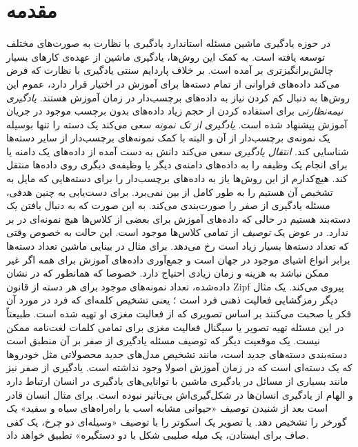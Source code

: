 \section{مقدمه}\label{intro}

 در حوزه یادگیری ماشین مسئله استاندارد یادگیری با نظارت به صورت‌های مختلف توسعه یافته است. به کمک این روش‌ها، یادگیری ماشین از عهده‌ی کارهای بسیار چالش‌برانگیزتری بر آمده است. بر خلاف پاردایم سنتی یادگیری با نظارت که فرض می‌کند داده‌های فراوانی از تمام دسته‌ها برای آموزش در اختیار قرار دارد، عموم این روش‌ها به دنبال کم کردن نیاز به داده‌های برچسب‌دار در زمان آموزش هستند. 
\emph{ یادگیری نیمه‌نظارتی}  \cite{chapel06}
برای استفاده کردن از حجم زیاد داده‌های بدون برچسب موجود در جریان آموزش پیشنهاد شده است. 
\emph{یادگیری از تک نمونه}  \cite{miller12}
سعی می‌کند یک دسته را تنها بوسیله یک نمونه‌ی برچسب‌دار از آن و البته با کمک نمونه‌های برچسب‌دار از سایر دسته‌ها شناسایی کند. 
\emph{ انتقال یادگیری}  \cite{pan10survey}
سعی می‌کند دانش به دست آمده از داده‌های یک دامنه یا برای انجام یک وظیفه را به داده‌های دامنه‌ی دیگر یا وظیفه‌ی دیگری روی داده‌ها منتقل کند. 
هیچ‌کدارم از این روش‌ها یاز به داده‌های برچسب‌دار را برای دسته‌هایی که مایل به تشخیص آن هستیم را به طور کامل از بین نمی‌برد. برای دست‌یابی به چنین هدفی، 
\cite{bengio08}
مسئله یادگیری از صفر را صورت‌بندی می‌کند. به این صورت که به دنبال یافتن یک دسته‌بند هستیم در حالی که داده‌های آموزش برای بعضی از کلاس‌ها هیچ نمونه‌ای در بر ندارد. در عوض یک \emph{ توصیف} از تمامی کلاس‌ها موجود است. این حالت به خصوص وقتی که تعداد دسته‌ها بسیار زیاد است رخ می‌دهد. برای مثال در بینایی ماشین تعداد دسته‌ها برابر انواع اشیای موجود در جهان است و جمع‌آوری داده‌های آموزش برای همه اگر غیر ممکن نباشد به هزینه و زمان زیادی احتیاج دارد. خصوصا که همانطور که در 
\cite{sala11}
نشان داده‌شده، تعداد نمونه‌های موجود برای هر دسته از قانون Zipf پیروی می‌کند.
 یک مثال دیگر رمزگشایی فعالیت ذهنی فرد است 
\cite{hinton09}؛
یعنی تشخیص کلمه‌ای که فرد در مورد آن فکر یا صحبت می‌کنند بر اساس تصویری که از فعالیت مغزی او تهیه شده است. طبیعتاً در این مسئله تهیه تصویر یا سیگنال فعالیت مغزی برای تمامی کلمات لغت‌نامه ممکن نیست. یک موقعیت دیگر که توصیف مسئله یادگیری از صفر بر آن منطبق است دسته‌بندی دسته‌های جدید است، مانند تشخیص مدل‌های جدید محصولاتی مثل خودروها  که یک دسته‌ای است که در زمان آموزش اصولا وجود نداشته است. یادگیری از صفر نیز مانند بسیاری از مسائل در یادگیری ماشین با توانایی‌های یادگیری در انسان ارتباط دارد و الهام از یادگیری انسان‌ها در شکل‌گیری‌اش بی‌تاثیر نبوده است. برای مثال انسان قادر است بعد از شنیدن توصیف «حیوانی مشابه اسب با راه‌راه‌های سیاه و سفید» یک گورخر را تشخیص دهد. یا تصویر یک اسکوتر را با توصیف «وسیله‌ای دو چرخ، یک کفی صاف برای ایستادن، یک میله صلیبی شکل با دو دستگیره» تطبیق خواهد داد. 

